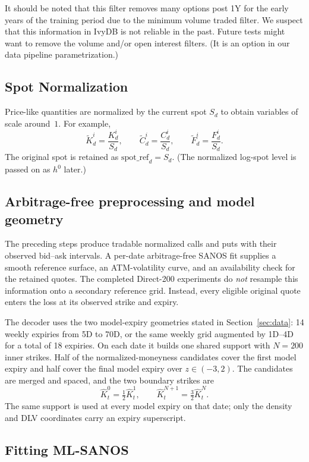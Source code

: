 \documentclass[11pt,a4paper]{article}
\begin{document}
It should be noted that this filter removes many options post 1Y for the early years of the training period due to the minimum volume
traded filter. We suspect that this information in IvyDB is not reliable in the past.
Future tests might want to remove the volume and/or open interest filters. (It is an option
in our data pipeline parametrization.)

\subsection{Spot Normalization}

Price-like quantities are normalized by the current spot \(S_d\) to obtain
variables of scale around~$1$. For example,
%
\[
    \widetilde{K}_d^i
    =
    \frac{K_d^i}{S_d},
    \qquad
    \widetilde{C}_d^i
    =
    \frac{C_d^i}{S_d},
    \qquad
    \widetilde{F}_d^i
    =
    \frac{F_d^i}{S_d}.
\]
The original spot is retained as
$
    \mathrm{spot\_ref}_d = S_d.
$
(The normalized log-spot level is passed on as $h^0$ later.)

\subsection{Arbitrage-free preprocessing and model geometry}

The preceding steps produce tradable normalized calls and puts with their
observed bid--ask intervals.  A per-date arbitrage-free SANOS fit supplies a
smooth reference surface, an ATM-volatility curve, and an availability check
for the retained quotes.  The completed Direct-200 experiments do
\emph{not} resample this information onto a secondary reference grid.
Instead, every eligible original quote enters the loss at its observed strike
and expiry.

The decoder uses the two model-expiry geometries stated in
Section~\ref{sec:data}: 14 weekly expiries from 5D to 70D, or the same weekly
grid augmented by 1D--4D for a total of 18 expiries.  On each date it builds
one shared support with $N=200$ inner strikes. Half of the normalized-moneyness
candidates cover the first model expiry and half cover the final model expiry
over $z\in(-3,2)$.  The candidates are merged and spaced, and the two boundary
strikes are
\[
  \hat K_t^0=\tfrac12\hat K_t^1,
  \qquad
  \hat K_t^{N+1}=\tfrac32\hat K_t^N.
\]
The same support is used at every model expiry on that date; only the density
and DLV coordinates carry an expiry superscript.

\subsection{Fitting ML-SANOS}
\end{document}
